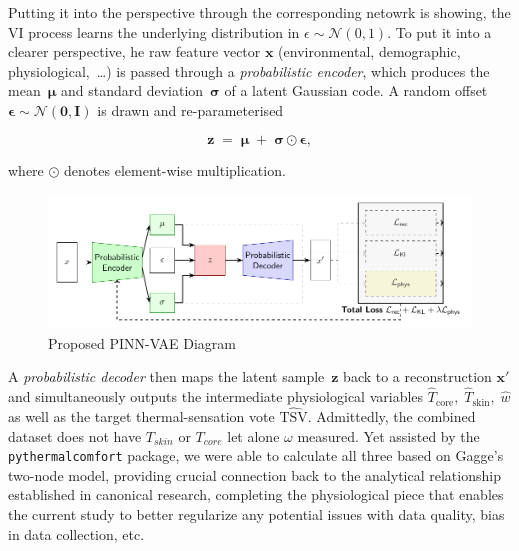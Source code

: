Putting it into the perspective through the corresponding netowrk is showing, the VI process learns the underlying distribution in $\epsilon \sim \mathcal{N}(0, 1)$. To put it into a clearer perspective, he raw feature vector $\mathbf{x}$ (environmental, demographic, physiological,~\dots) is passed through a \emph{probabilistic encoder}, which produces the mean~$\boldsymbol\mu$ and standard deviation~$\boldsymbol\sigma$ of a latent Gaussian code.  
A random offset $\boldsymbol\epsilon \sim \mathcal N(\mathbf 0,\mathbf I)$ is drawn and re-parameterised

\begin{equation}
    \mathbf z \;=\; \boldsymbol\mu \;+\; \boldsymbol\sigma \odot \boldsymbol\epsilon,
\end{equation}

\noindent where $\odot$ denotes element-wise multiplication.  


\begin{figure}[h!]
    \centering
    \includegraphics[width=0.95\linewidth]{fig/pinn_vae_go.pdf}
    \caption{Proposed PINN-VAE Diagram}
    \label{fig:diagram-losses}
\end{figure}


A \emph{probabilistic decoder} then maps the latent sample~$\mathbf z$ back to a reconstruction $\mathbf{x'}$ and simultaneously outputs the intermediate physiological variables
\(
\widehat T_{\text{core}},\;
\widehat T_{\text{skin}},\;
\widehat w
\)
as well as the target thermal-sensation vote $\widehat{\mathrm{TSV}}$. Admittedly, the combined dataset does not have $T_{skin}$ or $T_{core}$ let alone $\omega$ measured. Yet assisted by the \texttt{pythermalcomfort} package\cite{Tartarini_pythermalcomfort_2020}, %
we were able to calculate all three based on Gagge's two-node model\cite{gagge1986standard}, providing crucial connection back to the analytical relationship established in canonical research, completing the physiological piece that enables the current study to better regularize any potential issues with data quality, bias in data collection, etc.

